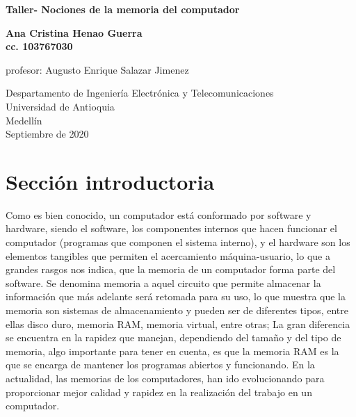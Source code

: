 \documentclass{article}
\begin{document}
\begin{titlepage}
    \begin{center}
        \vspace*{1cm}
            
        \Huge
        \textbf{Taller- Nociones de la memoria del computador}
            
        \vspace{0.5cm}
        \LARGE
        
            
        \vspace{1.5cm}
            
        \textbf{Ana Cristina Henao Guerra}\\
        \textbf{cc. 103767030}
            
        
        \vspace*{3cm}
        \large{profesor: Augusto Enrique Salazar Jimenez}
        \vfill
            
        \vspace{0.8cm}
            
        \Large
        Despartamento de Ingeniería Electrónica y Telecomunicaciones\\
        Universidad de Antioquia\\
        Medellín\\
        Septiembre de 2020
            
    \end{center}
\end{titlepage}

\tableofcontents
\newpage
\section{Sección introductoria}\label{intro}
Como es bien conocido, un computador está conformado por software y hardware, siendo el software, los componentes internos que hacen funcionar el computador (programas que componen el sistema interno), y el hardware son los elementos tangibles que permiten el acercamiento máquina-usuario, lo que a grandes rasgos nos indica, que la memoria de un computador forma parte del software. Se denomina memoria a aquel circuito que permite almacenar la información que más adelante será retomada para su uso, lo que muestra que la memoria son sistemas de almacenamiento y pueden ser de diferentes tipos, entre ellas disco duro, memoria RAM, memoria virtual, entre otras; La  gran diferencia se encuentra en la rapidez que manejan, dependiendo del tamaño y del tipo de memoria, algo importante para tener en cuenta, es que la memoria RAM es la que se encarga de mantener los programas abiertos y funcionando.
En la actualidad, las memorias de los computadores, han ido evolucionando para proporcionar mejor calidad y rapidez en la realización del trabajo en un computador.\\
\end{document}
